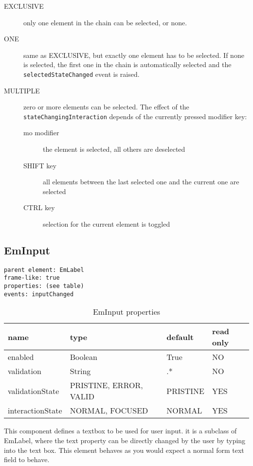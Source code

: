 \begin{description}
    \item[EXCLUSIVE] only one element in the chain can be selected, or none.
    \item[ONE] same as EXCLUSIVE, but exactly one element has to be selected. If none is selected, the first one in the chain is automatically selected and the \texttt{selectedStateChanged} event is raised.
    \item[MULTIPLE] zero or more elements can be selected. The effect of the \texttt{stateChangingInteraction} depends of the currently pressed modifier key:
    \begin{description}
        \item[mo modifier] the element is selected, all others are deselected
        \item[SHIFT key] all elements between the last selected one and the current one are selected
        \item[CTRL key] selection for the current element is toggled
    \end{description}
\end{description}

\subsection{EmInput}

\begin{verbatim}
parent element: EmLabel
frame-like: true
properties: (see table)
events: inputChanged
\end{verbatim}

\begin{table}[ht]
\caption{EmInput properties}
\centering
\begin{tabular}{l l l l}
\hline\hline
name & type & default & read only \\ [0.5ex]
\hline %
enabled & Boolean & True & NO \\
validation & String & .* & NO \\
validationState & PRISTINE, ERROR, VALID & PRISTINE & YES \\
interactionState & NORMAL, FOCUSED & NORMAL & YES \\ [1ex] %
\hline %
\end{tabular}

\end{table}

This component defines a textbox to be used for user input. it is a subclass of EmLabel, where the
text property can be directly changed by the user by typing into the text box. This element behaves
as you would expect a normal form text field to behave.

